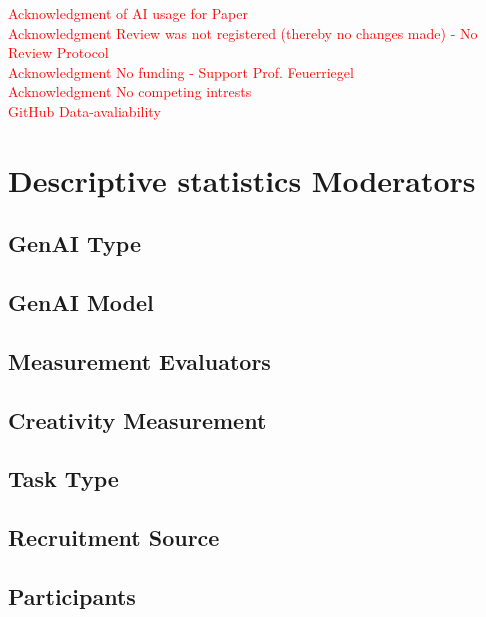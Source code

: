 \documentclass[manuscript, screen, review, acmsmall, anonymous]{acmart}
\newcommand{\TODO}[1]{\textcolor{red}{#1}}
\begin{document}
\newpage



\newpage
\TODO{Acknowledgment of AI usage for Paper}\\
\TODO{Acknowledgment Review was not registered (thereby no changes made) - No Review Protocol}\\
\TODO{Acknowledgment No funding - Support Prof. Feuerriegel}\\
\TODO{Acknowledgment No competing intrests}\\
\TODO{GitHub Data-avaliability}
\appendix
\section{Descriptive statistics Moderators}
\subsection{GenAI Type}
\begin{table}[H]
  \centering
  
\end{table}
\subsection{GenAI Model}
\begin{table}[H]
  \centering
  
\end{table}
\subsection{Measurement Evaluators}
\begin{table}[H]
  \centering
  
\end{table}
\subsection{Creativity Measurement}
\begin{table}[H]
  \centering
  
\end{table}
\subsection{Task Type}
\begin{table}[H]
  \centering
  
\end{table}
\subsection{Recruitment Source}
\begin{table}[H]
  \centering
  
\end{table}
\subsection{Participants}
\begin{table}[H]
  \centering
  
\end{table}
\end{document}
